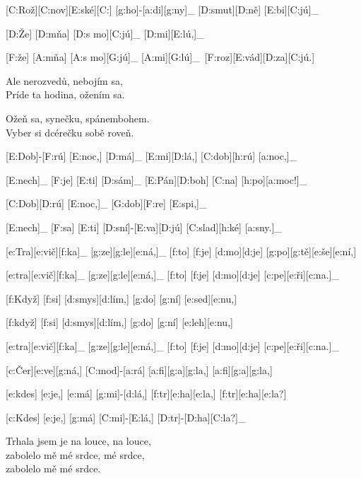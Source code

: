 
[C:Rož][C:nov][E:ské][C:] [g:ho]-[a:di][g:ny]_ [D:smut][D:ně] [E:bi][C:jú]_\

[D:Že] [D:mňa] [D:s mo][C:jú]_ [D:mi][E:lú,]_\

[F:že] [A:mňa] [A:s mo][G:jú]_ [A:mi][G:lú]_\
[F:roz][E:vád][D:za][C:jú.]\

Ale nerozvedů, nebojím sa,\\
Príde ta hodina, ožením sa.

Ožeň sa, synečku, spánembohem.\\
Vyber si dcérečku sobě roveň.



[E:Dob]-[F:rú] [E:noc,] [D:má]_ [E:mi][D:lá,] [C:dob][h:rú] [a:noc,]_\

[E:nech]_ [F:je] [E:ti] [D:sám]_ [E:Pán][D:boh] [C:na] [h:po][a:moc!]_\

[C:Dob][D:rú] [E:noc,]_ [G:dob][F:re] [E:spi,]_\

[E:nech]_ [F:sa] [E:ti] [D:sní]-[E:va][D:jú] [C:slad][h:ké] [a:sny.]_\



[e:Tra][e:vič][f:ka]_ [g:ze][g:le][e:ná,]_ [f:to] [f:je] [d:mo][d:je] [g:po][g:tě][e:še][e:ní,]\

[e:tra][e:vič][f:ka]_ [g:ze][g:le][e:ná,]_ [f:to] [f:je] [d:mo][d:je] [c:pe][e:ři][c:na.]_\

[f:Když] [f:si] [d:smys][d:lím,] [g:do] [g:ní] [e:sed][e:nu,]\

[f:když] [f:si] [d:smys][d:lím,] [g:do] [g:ní] [e:leh][e:nu,]\

[e:tra][e:vič][f:ka]_ [g:ze][g:le][e:ná,]_ [f:to] [f:je] [d:mo][d:je] [c:pe][e:ři][c:na.]_\



[c:Čer][e:ve][g:ná,] [C:mod]-[a:rá] [a:fi][g:a][g:la,] [a:fi][g:a][g:la,]\

[e:kdes] [e:je,] [e:má] [g:mi]-[d:lá,] [f:tr][e:ha][e:la,] [f:tr][e:ha][e:la?]\

[c:Kdes] [e:je,] [g:má] [C:mi]-[E:lá,] [D:tr]-[D:ha][C:la?]_\

Trhala jsem je na louce, na louce,\\
zabolelo mě mé srdce, mé srdce,\\
zabolelo mě mé srdce.



